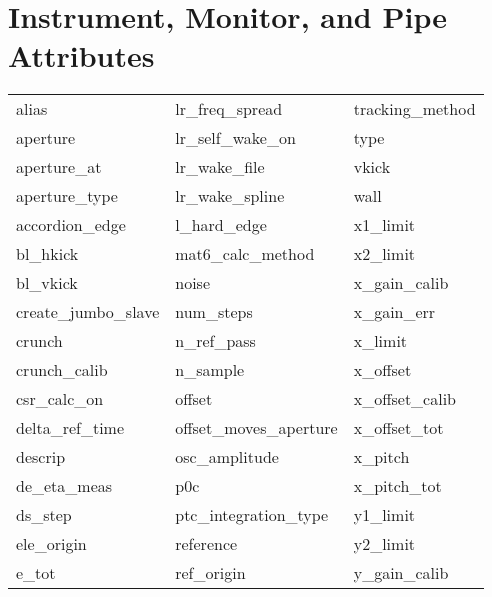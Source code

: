  \section{Instrument, Monitor, and Pipe Attributes}
 \label{s:list.instrument}
 
 \begin{tabular}{lll} \toprule
alias                       & lr_freq_spread              & tracking_method             \\
aperture                    & lr_self_wake_on             & type                        \\
aperture_at                 & lr_wake_file                & vkick                       \\
aperture_type               & lr_wake_spline              & wall                        \\
accordion_edge              & l_hard_edge                 & x1_limit                    \\
bl_hkick                    & mat6_calc_method            & x2_limit                    \\
bl_vkick                    & noise                       & x_gain_calib                \\
create_jumbo_slave          & num_steps                   & x_gain_err                  \\
crunch                      & n_ref_pass                  & x_limit                     \\
crunch_calib                & n_sample                    & x_offset                    \\
csr_calc_on                 & offset                      & x_offset_calib              \\
delta_ref_time              & offset_moves_aperture       & x_offset_tot                \\
descrip                     & osc_amplitude               & x_pitch                     \\
de_eta_meas                 & p0c                         & x_pitch_tot                 \\
ds_step                     & ptc_integration_type        & y1_limit                    \\
ele_origin                  & reference                   & y2_limit                    \\
e_tot                       & ref_origin                  & y_gain_calib                \\

\end{tabular}
